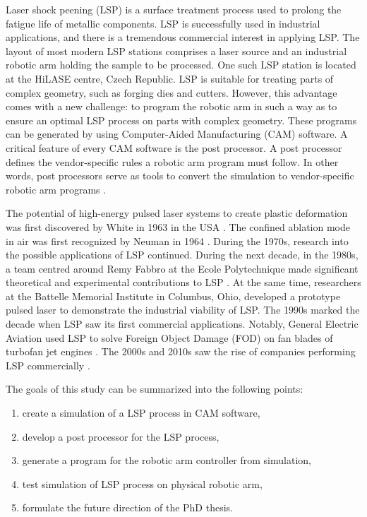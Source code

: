 \label{sec:introduction}

Laser shock peening (LSP) is a surface treatment process used to prolong the fatigue life of metallic components. LSP is successfully used in industrial applications, and there is a tremendous commercial interest in applying LSP. The layout of most modern LSP stations comprises a laser source and an industrial robotic arm holding the sample to be processed. One such LSP station is located at the HiLASE centre, Czech Republic. LSP is suitable for treating parts of complex geometry, such as forging dies and cutters. However, this advantage comes with a new challenge: to program the robotic arm in such a way as to ensure an optimal LSP process on parts with complex geometry. These programs can be generated by using Computer-Aided Manufacturing (CAM) software. A critical feature of every CAM software is the post processor. A post processor defines the vendor-specific rules a robotic arm program must follow.  In other words, post processors serve as tools to convert the simulation to vendor-specific robotic arm programs \cite{ding_ye_2006}.

The potential of high-energy pulsed laser systems to create plastic deformation was first discovered by White in 1963 in the USA \cite{white_1963}. The confined ablation mode in air was first recognized by Neuman in 1964 \cite{neuman_1964}. During the 1970s, research into the possible applications of LSP continued. During the next decade, in the 1980s, a team centred around Remy Fabbro at the Ecole Polytechnique made significant theoretical and experimental contributions to LSP \cite{fabbro_fournier_ballard_devaux_virmont_1990}. At the same time, researchers at the Battelle Memorial Institute in Columbus, Ohio, developed a prototype pulsed laser to demonstrate the industrial viability of LSP. The 1990s marked the decade when LSP saw its first commercial applications. Notably, General Electric Aviation used LSP to solve Foreign Object Damage (FOD) on fan blades of turbofan jet engines \cite{airforce}. The 2000s and 2010s saw the rise of companies performing LSP commercially \cite{sano}.

The goals of this study can be summarized into the following points:
\begin{enumerate}

    \item create a simulation of a LSP process in CAM software,
    \item develop a post processor for the LSP process, 
    \item generate a program  for the robotic arm controller from simulation,
    \item test simulation of LSP process on physical robotic arm,
    \item formulate the future direction of the PhD thesis.
    
\end{enumerate}

